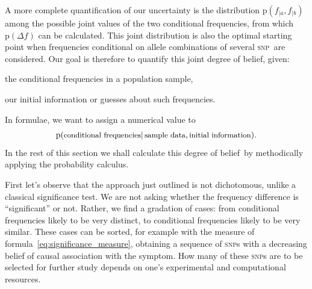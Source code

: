 \documentclass[\ifafour a4paper,12pt,\else a5paper,10pt,\fi%
onecolumn,oneside,article,%
british%
]{memoir}
\theoremstyle{remark}
\theoremstyle{innote}
\newcommand*{\pf}{\mathrm{p}}%
\renewcommand*{\|}{\mathpunct{|}}
\newcommand*{\puzzle}{\maltese}
\newcommand{\mynote}[1]{ {\color{notecolour}\puzzle\ #1}}
\newcommand*{\ptext}[1]{\text{\small #1}}
\newcommand*{\dob}{degree of belief}
\newcommand*{\snp}{\textsc{snp}}
\newcommand*{\ya}{a}
\newcommand*{\yb}{b}
\newcommand*{\df}{\Delta f}
\begin{document}
A more complete quantification of our uncertainty is the distribution
$\pf(f_{|\ya}, f_{|\yb})$ among the possible joint values of the two
conditional frequencies, from which $\pf(\df)$ can be calculated. This
joint distribution is also the optimal starting point when frequencies
conditional on allele combinations of several \snp\ are considered. Our
goal is therefore to quantify this joint \dob, given:
\begin{enumerate*}[label=(\arabic*)]
\item the conditional frequencies in a population sample, \item our initial
  information or guesses about such frequencies.
\end{enumerate*} In formulae, we want to assign a numerical value to
\begin{equation}\label{eq:p_goal}
  \pf(\ptext{conditional frequencies} \|
  \ptext{sample data}, \ptext{initial information}).
\end{equation}
In the rest of this section we shall calculate this \dob\ by methodically
applying the probability calculus.

\medskip

First let's observe that the approach just outlined is not dichotomous,
unlike a classical significance test. We are not asking whether the
frequency difference is \enquote{significant} or not. Rather, we find a
gradation of cases: from conditional frequencies likely to be very
distinct, to conditional frequencies likely to be very similar. These cases
can be sorted, for example with the measure of
formula~\eqref{eq:significance_measure}, obtaining a sequence of \snp s
with a decreasing belief of causal association with the symptom. How many
of these \snp s are to be selected for further study depends on one's
experimental and computational resources.
\textcolor{white}{If you find this you can claim a postcard from us.}


\end{document}
